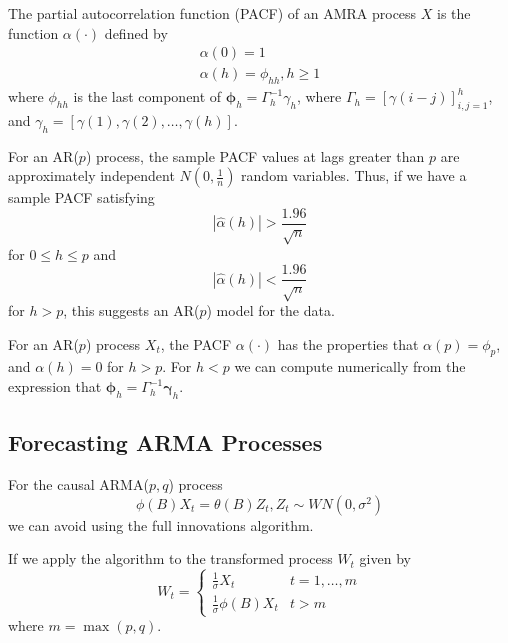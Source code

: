 \begin{defn}[PACF]
  \label{defn:arma_processes:8}
  The partial autocorrelation function (PACF) of an AMRA process $X$
  is the function $\alpha(\cdot)$ defined by
  \begin{align}
    \label{eq:31}
    \alpha(0) = 1 \\
    \alpha(h) = \phi_{hh}, h \geq 1
  \end{align} where $\phi_{hh}$ is the last component of
  $\mathbf{\phi}_{h} = \Gamma_{h}^{-1} \gamma_{h}$, where $\Gamma_{h}
  = [\gamma(i - j)]^{h}_{i,j = 1}$, and $\gamma_{h} = [\gamma(1),
  \gamma(2), \dots, \gamma(h)]$.
\end{defn}

\begin{thm}
  \label{defn:arma_processes:9}
  For an AR($p$) process, the sample PACF values at lags greater than
  $p$ are approximately independent $N(0, \frac{1}{n})$ random
  variables.  Thus, if we have a sample PACF satisfying
  \begin{equation}
    \label{eq:32}
    |\hat \alpha(h)| > \frac{1.96}{\sqrt{n}}
  \end{equation} for $0 \leq h \leq p$ and
  \begin{equation}
    \label{eq:33}
    |\hat \alpha(h)| < \frac{1.96}{\sqrt{n}}
  \end{equation} for $h > p$, this suggests an AR($p$) model for the data.
\end{thm}

\begin{thm}
  \label{defn:arma_processes:10}
  For an AR($p$) process $X_{t}$, the PACF $\alpha(\cdot)$ has the
  properties that $\alpha(p) = \phi_{p}$, and $\alpha(h) = 0$ for $h >
  p$.  For $h < p$ we can compute numerically from the expression that
  $\mathbf{\phi}_{h} = \Gamma^{-1}_{h} \mathbf{\gamma}_{h}$.
\end{thm}

\subsection{Forecasting ARMA Processes}
\label{sec:forec-arma-proc}

For the causal ARMA($p, q$) process
\begin{equation}
  \label{eq:35}
  \phi(B) X_{t} = \theta(B) Z_{t}, Z_{t} \sim WN(0, \sigma^{2})
\end{equation} we can avoid using the full innovations algorithm.

If we apply the algorithm to the transformed process $W_{t}$ given by
\begin{equation}
  \label{eq:36}
  W_{t} =
  \begin{cases}
    \frac{1}{\sigma} X_{t} & t = 1, \dots, m \\
    \frac{1}{\sigma} \phi(B) X_{t} & t > m
  \end{cases}
\end{equation} where $m = \max(p, q)$.

